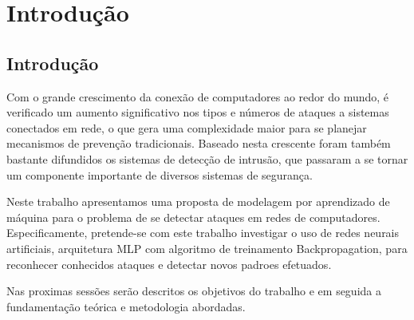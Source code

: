 \part{Introdução}
\chapter[Introdução]{Introdução}

Com o grande crescimento da conexão de computadores ao redor do mundo, é verificado um aumento significativo nos tipos e números de ataques a sistemas conectados em rede, o que gera uma complexidade maior para se planejar mecanismos de prevenção tradicionais. Baseado nesta crescente foram também bastante difundidos os sistemas de detecção de intrusão, que passaram a se tornar um componente importante de diversos sistemas de segurança.

Neste trabalho apresentamos uma proposta de modelagem por aprendizado de máquina para o problema de se detectar ataques em redes de computadores. Especificamente, pretende-se com este trabalho investigar o uso de redes neurais artificiais,  arquitetura MLP com algoritmo de treinamento Backpropagation, para reconhecer conhecidos ataques e detectar novos padroes efetuados.

Nas proximas sessões serão descritos os objetivos do trabalho e em seguida a fundamentação teórica e metodologia abordadas.